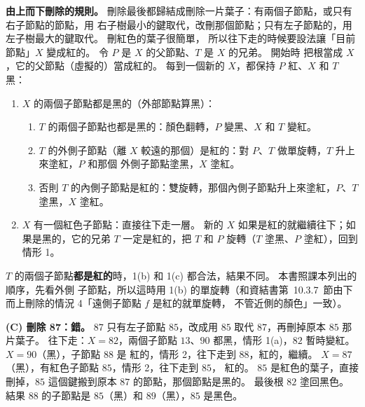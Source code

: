 \begin{pastsoln}
\textbf{由上而下刪除的規則。} 刪除最後都歸結成刪除一片葉子：有兩個子節點，或只有右子節點的節點，用
右子樹最小的鍵取代，改刪那個節點；只有左子節點的，用左子樹最大的鍵取代。 刪紅色的葉子很簡單，
所以往下走的時候要設法讓「目前節點」$X$ 變成紅的。 令 $P$ 是 $X$ 的父節點、$T$ 是 $X$ 的兄弟。 開始時
把根當成 $X$，它的父節點（虛擬的）當成紅的。 每到一個新的 $X$，都保持 $P$ 紅、$X$ 和 $T$ 黑：
\begin{enumerate}
\item $X$ 的兩個子節點都是黑的（外部節點算黑）：
\begin{enumerate}
\item $T$ 的兩個子節點也都是黑的：顏色翻轉，$P$ 變黑、$X$ 和 $T$ 變紅。
\item $T$ 的外側子節點（離 $X$ 較遠的那個）是紅的：對 $P$、$T$ 做單旋轉，$T$ 升上來塗紅，$P$ 和那個
外側子節點塗黑，$X$ 塗紅。
\item 否則 $T$ 的內側子節點是紅的：雙旋轉，那個內側子節點升上來塗紅，$P$、$T$ 塗黑，$X$ 塗紅。
\end{enumerate}
\item $X$ 有一個紅色子節點：直接往下走一層。 新的 $X$ 如果是紅的就繼續往下；如果是黑的，它的兄弟
$T$ 一定是紅的，把 $T$ 和 $P$ 旋轉（$T$ 塗黑、$P$ 塗紅），回到情形 1。
\end{enumerate}
$T$ 的兩個子節點\textbf{都是紅的}時，1(b) 和 1(c) 都合法，結果不同。 本書照課本列出的順序，先看外側
子節點，所以這時用 1(b) 的單旋轉（和資結書第~10.3.7~節由下而上刪除的情況 4「遠側子節點 $f$ 是紅的就單旋轉，
不管近側的顏色」一致）。

\textbf{(C) 刪除 87：錯。} $87$ 只有左子節點 $85$，改成用 $85$ 取代 $87$，再刪掉原本 $85$ 那片葉子。
往下走：$X = 82$，兩個子節點 $13$、$90$ 都黑，情形 1(a)，$82$ 暫時變紅。 $X = 90$（黑），子節點 $88$ 是
紅的，情形 2，往下走到 $88$，紅的，繼續。 $X = 87$（黑），有紅色子節點 $85$，情形 2，往下走到 $85$，
紅的。 $85$ 是紅色的葉子，直接刪掉，$85$ 這個鍵搬到原本 $87$ 的節點，那個節點是黑的。 最後根 $82$
塗回黑色。 結果 $88$ 的子節點是 $85$（黑）和 $89$（黑），$85$ 是黑色。


\end{pastsoln}
